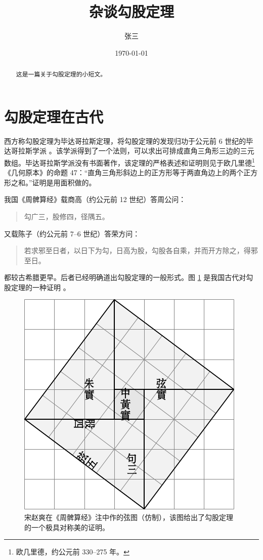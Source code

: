 \documentclass[UTF8]{ctexart}
\title{\heiti 杂谈勾股定理}
\author{\kaishu 张三}
\date{\today}
\newenvironment{myquote}
  {\begin{quote}\kaishu\zihao{-5}}
  {\end{quote}}
\begin{document}
\maketitle

\begin{abstract}
这是一篇关于勾股定理的小短文。
\end{abstract}

\tableofcontents

\section{勾股定理在古代}
\label{sec:ancient}

西方称勾股定理为毕达哥拉斯定理，将勾股定理的发现归功于公元前 6 世纪的毕达哥拉斯学派 \cite{Kline}。该学派得到了一个法则，可以求出可排成直角三角形三边的三元数组。毕达哥拉斯学派没有书面著作，该定理的严格表述和证明则见于欧几里德\footnote{欧几里德，约公元前 330--275 年。}《几何原本》的命题 47：“直角三角形斜边上的正方形等于两直角边上的两个正方形之和。”证明是用面积做的。

我国《周髀算经》载商高（约公元前 12 世纪）答周公问：
\begin{myquote}
勾广三，股修四，径隅五。
\end{myquote}
又载陈子（约公元前 7--6 世纪）答荣方问：
\begin{myquote}
若求邪至日者，以日下为勾，日高为股，勾股各自乘，并而开方除之，得邪至日。
\end{myquote}
都较古希腊更早。后者已经明确道出勾股定理的一般形式。图 \ref{fig:xiantu} 是我国古代对勾股定理的一种证明 \cite{quanjing}。
\begin{figure}[ht]
  \centering
  \includegraphics[scale=0.6]{xiantu.pdf}
  \caption{宋赵爽在《周髀算经》注中作的弦图（仿制），该图给出了勾股定理的一个极具对称美的证明。}
  \label{fig:xiantu}
\end{figure}
\end{document}
